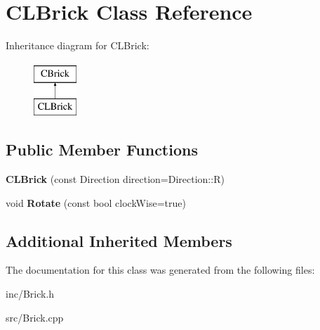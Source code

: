 \hypertarget{classCLBrick}{\section{C\-L\-Brick Class Reference}
\label{classCLBrick}
}
Inheritance diagram for C\-L\-Brick\-:\begin{figure}[H]
\begin{center}
\leavevmode
\includegraphics[height=2.000000cm]{classCLBrick}
\end{center}
\end{figure}
\subsection*{Public Member Functions}
\begin{DoxyCompactItemize}
\item 
\hypertarget{classCLBrick_a2e902d93bf6baa4bfbe2c99ceb85223e}{{\bfseries C\-L\-Brick} (const Direction direction=Direction\-::\-R)}\label{classCLBrick_a2e902d93bf6baa4bfbe2c99ceb85223e}

\item 
\hypertarget{classCLBrick_a78aaef2a95d9943faa1d0572ece28246}{void {\bfseries Rotate} (const bool clock\-Wise=true)}\label{classCLBrick_a78aaef2a95d9943faa1d0572ece28246}

\end{DoxyCompactItemize}
\subsection*{Additional Inherited Members}


The documentation for this class was generated from the following files\-:\begin{DoxyCompactItemize}
\item 
inc/Brick.\-h\item 
src/Brick.\-cpp\end{DoxyCompactItemize}

